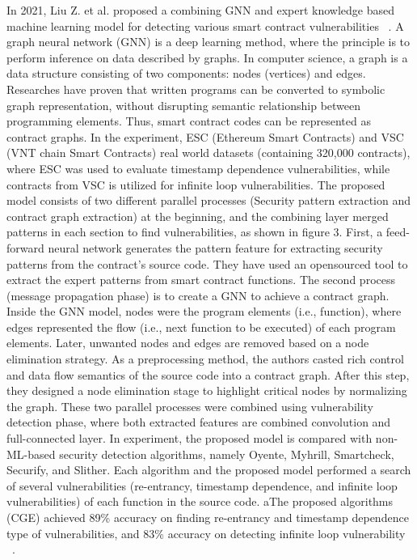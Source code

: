 In 2021, Liu Z. et al. proposed a combining GNN and expert knowledge based machine learning model for detecting various smart contract vulnerabilities ~\cite{hwang2020gap}.
A graph neural network (GNN) is a deep learning method, where the principle is to perform inference on data described by graphs.
In computer science, a graph is a data structure consisting of two components: nodes (vertices) and edges. Researches have proven that written programs can be converted to symbolic graph representation, without disrupting semantic relationship between programming elements.
Thus, smart contract codes can be represented as contract graphs.
In the experiment, ESC (Ethereum Smart Contracts) and VSC (VNT chain Smart Contracts) real world datasets (containing 320,000 contracts), where ESC was used to evaluate timestamp dependence vulnerabilities, while contracts from VSC is utilized for infinite loop vulnerabilities.
The proposed model consists of two different parallel processes (Security pattern extraction and contract graph extraction) at the beginning, and the combining layer merged patterns in each section to find vulnerabilities, as shown in figure 3.
First, a feed-forward neural network generates the pattern feature for extracting security patterns from the contract's source code.
They have used an opensourced tool to extract the expert patterns from smart contract functions.
The second process (message propagation phase) is to create a GNN to achieve a contract graph.
Inside the GNN model, nodes were the program elements (i.e., function), where edges represented the flow (i.e., next function to be executed) of each program elements.
Later, unwanted nodes and edges are removed based on a node elimination strategy.
As a preprocessing method, the authors casted rich control and data flow semantics of the source code into a contract graph.
After this step, they designed a node elimination stage to highlight critical nodes by normalizing the graph.
These two parallel processes were combined using vulnerability detection phase, where both extracted features are combined convolution and full-connected layer.
In experiment, the proposed model is compared with non-ML-based security detection algorithms, namely Oyente, Myhrill, Smartcheck, Securify, and Slither.
Each algorithm and the proposed model performed a search of several vulnerabilities (re-entrancy, timestamp dependence, and infinite loop vulnerabilities) of each function in the source code.
aThe proposed algorithms (CGE) achieved 89\% accuracy on finding re-entrancy and timestamp dependence type of vulnerabilities, and 83\% accuracy on detecting infinite loop vulnerability ~\cite{hwang2020gap}.

